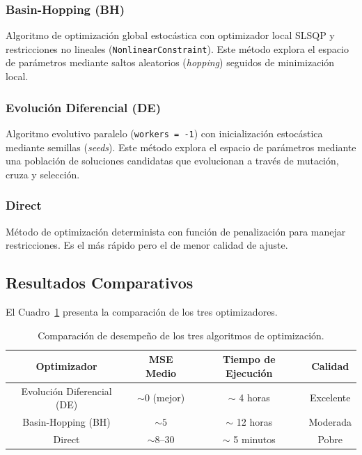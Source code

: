 \documentclass{article}
\begin{document}
\subsubsection{Basin-Hopping (BH)}

Algoritmo de optimizaci\'on global estoc\'astica con optimizador local SLSQP y restricciones no lineales (\texttt{NonlinearConstraint}). Este m\'etodo explora el espacio de par\'ametros mediante saltos aleatorios (\textit{hopping}) seguidos de minimizaci\'on local.

\subsubsection{Evoluci\'on Diferencial (DE)}

Algoritmo evolutivo paralelo (\texttt{workers = -1}) con inicializaci\'on estoc\'astica mediante semillas (\textit{seeds}). Este m\'etodo explora el espacio de par\'ametros mediante una poblaci\'on de soluciones candidatas que evolucionan a trav\'es de mutaci\'on, cruza y selecci\'on.

\subsubsection{Direct}

M\'etodo de optimizaci\'on determinista con funci\'on de penalizaci\'on para manejar restricciones. Es el m\'as r\'apido pero el de menor calidad de ajuste.

\subsection{Resultados Comparativos}

El Cuadro~\ref{tab:optim-comp} presenta la comparaci\'on de los tres optimizadores.

\begin{table}[htbp]
\centering
\caption{Comparaci\'on de desempe\~no de los tres algoritmos de optimizaci\'on.}
\label{tab:optim-comp}
\begin{tabular}{@{}cccc@{}}
\toprule
\textbf{Optimizador} & \textbf{MSE Medio} & \textbf{Tiempo de Ejecuci\'on} & \textbf{Calidad} \\
\midrule
Evoluci\'on Diferencial (DE) & $\sim 0$ (mejor) & $\sim$ 4 horas & Excelente \\
Basin-Hopping (BH)           & $\sim 5$         & $\sim$ 12 horas & Moderada \\
Direct                       & $\sim 8$--30     & $\sim$ 5 minutos & Pobre \\
\bottomrule
\end{tabular}
\end{table}
\end{document}
